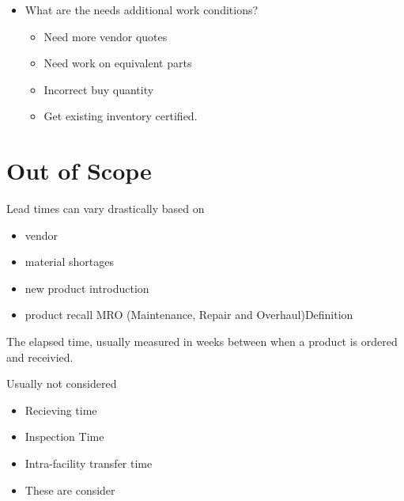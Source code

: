 \documentclass[letterpaper,10pt,english]{sphinxmanual}
\begin{document}
\begin{enumerate}
\begin{itemize}
\item {} 
What are the needs additional work conditions?
\begin{itemize}
\item {} 
Need more vendor quotes

\item {} 
Need work on equivalent parts

\item {} 
Incorrect buy quantity

\item {} 
Get existing inventory certified.

\end{itemize}

\end{itemize}

\end{enumerate}


\section{Out of Scope}
\label{\detokenize{Questions:out-of-scope}}
Lead times can vary drastically based on
\begin{itemize}
\item {} 
vendor

\item {} 
material shortages

\item {} 
new product introduction

\item {} 
product recall MRO (Maintenance, Repair and Overhaul)Definition

\end{itemize}

The elapsed time, usually measured in weeks between when a product
is ordered and receivied.

Usually not considered
\begin{itemize}
\item {} 
Recieving time

\item {} 
Inspection Time

\item {} 
Intra-facility transfer time

\item {} 
These are consider 

\end{itemize}
\end{document}
